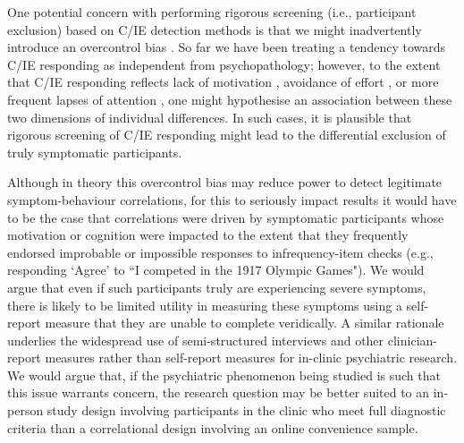 \documentclass[a4paper,notitlepage,12pt]{article}
\begin{document}
One potential concern with performing rigorous screening (i.e., participant exclusion) based on C/IE detection methods is that we might inadvertently introduce an overcontrol bias \cite{elwert2014endogenous}. So far we have been treating a tendency towards C/IE responding as independent from psychopathology; however, to the extent that C/IE responding reflects lack of motivation \cite{barch2015mechanisms}, avoidance of effort \cite{cohen2001impairments, culbreth2016negative}, or more frequent lapses of attention \cite{kane2016individual, robison2017neurotic}, one might hypothesise an association between these two dimensions of individual differences. In such cases, it is plausible that rigorous screening of C/IE responding might lead to the differential exclusion of truly symptomatic participants. 

Although in theory this overcontrol bias may reduce power to detect legitimate symptom-behaviour correlations, for this to seriously impact results it would have to be the case that correlations were driven by symptomatic participants whose motivation or cognition were impacted to the extent that they frequently endorsed improbable or impossible responses to infrequency-item checks (e.g., responding `Agree' to ``I competed in the 1917 Olympic Games"). We would argue that even if such participants truly are experiencing severe symptoms, there is likely to be limited utility in measuring these symptoms using a self-report measure that they are unable to complete veridically. A similar rationale underlies the widespread use of semi-structured interviews and other clinician-report measures rather than self-report measures for in-clinic psychiatric research. We would argue that, if the psychiatric phenomenon being studied is such that this issue warrants concern, the research question may be better suited to an in-person study design involving participants in the clinic who meet full diagnostic criteria than a correlational design involving an online convenience sample.
\end{document}
